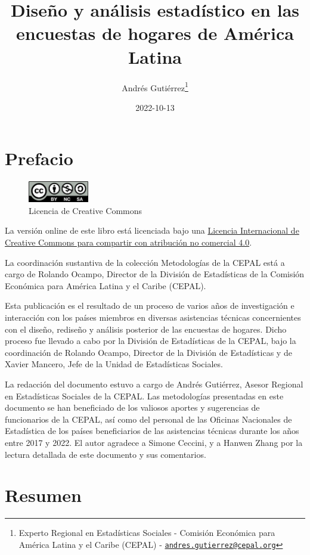 \documentclass[
  12pt,
]{book}
\title{Diseño y análisis estadístico en las encuestas de hogares de América Latina}
\author{Andrés Gutiérrez\footnote{Experto Regional en Estadísticas Sociales - Comisión Económica para América Latina y el Caribe (CEPAL) - \href{mailto:andres.gutierrez@cepal.org}{\nolinkurl{andres.gutierrez@cepal.org}}}}
\date{2022-10-13}
\begin{document}
\maketitle

{
\hypersetup{linkcolor=}
\setcounter{tocdepth}{1}
\tableofcontents
}
\listoffigures
\listoftables
\hypertarget{prefacio}{%
\chapter*{Prefacio}\label{prefacio}}

\begin{figure}
\includegraphics[width=100px]{Pics/CClicence} \caption{Licencia de Creative Commons}\label{fig:unnamed-chunk-1}
\end{figure}

La versión online de este libro está licenciada bajo una \href{http://creativecommons.org/licenses/by-nc-sa/4.0/}{Licencia Internacional de Creative Commons para compartir con atribución no comercial 4.0}.

La coordinación sustantiva de la colección Metodologías de la CEPAL está a cargo de Rolando Ocampo, Director de la División de Estadísticas de la Comisión Económica para América Latina y el Caribe (CEPAL).

Esta publicación es el resultado de un proceso de varios años de investigación e interacción con los países miembros en diversas asistencias técnicas concernientes con el diseño, rediseño y análisis posterior de las encuestas de hogares. Dicho proceso fue llevado a cabo por la División de Estadísticas de la CEPAL, bajo la coordinación de Rolando Ocampo, Director de la División de Estadísticas y de Xavier Mancero, Jefe de la Unidad de Estadísticas Sociales.

La redacción del documento estuvo a cargo de Andrés Gutiérrez, Asesor Regional en Estadísticas Sociales de la CEPAL. Las metodologías presentadas en este documento se han beneficiado de los valiosos aportes y sugerencias de funcionarios de la CEPAL, así como del personal de las Oficinas Nacionales de Estadística de los países beneficiarios de las asistencias técnicas durante los años entre 2017 y 2022. El autor agradece a Simone Ceccini, y a Hanwen Zhang por la lectura detallada de este documento y sus comentarios.

\hypertarget{resumen}{%
\chapter*{Resumen}\label{resumen}}
\end{document}
